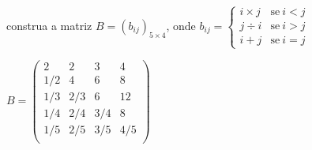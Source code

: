 \documentclass[pdftex, brazil, 12pt, oneside, addpoints, answers]{exam}
\begin{document}
\begin{questions}
construa a matriz $B = (b_{ij})_{5 \times 4}$, onde
$b_{ij} =
    \begin{cases}
      i \times j & \text{se}\ i < j\\
      j \div i   & \text{se}\ i > j\\
      i + j      & \text{se}\ i = j
    \end{cases}
$
\begin{solutionorbox}[1.5in]
$B = \begin{pmatrix}
   2    & 2    & 3    & 4\\
   1/2  & 4    & 6    & 8\\
   1/3  & 2/3  & 6    & 12\\
   1/4  & 2/4  & 3/4  & 8\\
   1/5  & 2/5  & 3/5  & 4/5\\
\end{pmatrix}$
\end{solutionorbox}




\end{questions}
\end{document}
